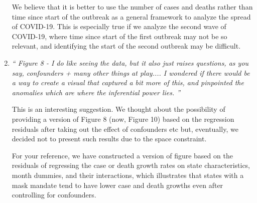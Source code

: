 \documentclass[11pt]{article}
\begin{document}
\begin{enumerate}
We believe that it is better to use the number of cases and deaths rather than time since start of the outbreak as a  general framework to analyze the spread of COVID-19. This is especially true if we analyze the second wave of COVID-19, where time since start of the first outbreak may not be so relevant, and identifying the start of the second outbreak may be difficult. 



\item \textit{`` Figure 8 - I do like seeing the data, but it also just raises questions, as you say, confounders + many other things at play.... I wondered if there would be a way to create a visual that captured a bit more of this, and pinpointed the anomalies which are where the inferential power lies. ''}

This is an interesting suggestion. We thought about the possibility of providing a version of Figure 8 (now, Figure 10) based on the regression residuals after taking out the effect of confounders etc but, eventually, we decided not to present such results due to the space constraint.  


For your reference, we have constructed a version of  figure based on the residuals of regressing the case or death growth rates on state characteristics, month dummies, and their interactions, which illustrates that states with a mask mandate tend to have lower case and death growths even after controlling for confounders.    %


\end{enumerate}
\end{document}
